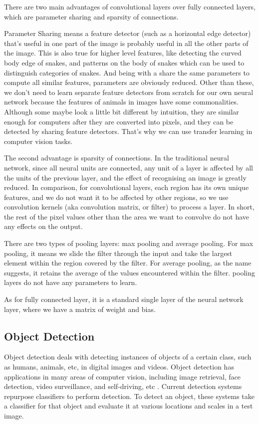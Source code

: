 \documentclass{article}
\begin{document}
There are two main advantages of convolutional layers over fully connected layers, which are parameter sharing and sparsity of connections.

Parameter Sharing means a feature detector (such as a horizontal edge detector) that's useful in one part of the image is probably useful in all the other parts of the image. This is also true for higher level features, like detecting the curved body edge of snakes, and patterns on the body of snakes which can be used to distinguish categories of snakes. And being with a share the same parameters to compute all similar features, parameters are obviously reduced. Other than these, we don't need to learn separate feature detectors from scratch for our own neural network because the features of animals in images have some commonalities. Although some maybe look a little bit different by intuition, they are similar enough for computers after they are converted into pixels, and they can be detected by sharing feature detectors. That's why we can use transfer learning in computer vision tasks.

The second advantage is sparsity of connections. In the traditional neural network, since all neural units are connected, any unit of a layer is affected by all the units of the previous layer, and the effect of recognising an image is greatly reduced. In comparison, for convolutional layers, each region has its own unique features, and we do not want it to be affected by other regions, so we use convolution kernels (aka convolution matrix, or filter) to process a layer. In short, the rest of the pixel values other than the area we want to convolve do not have any effects on the output.

There are two types of pooling layers: max pooling and average pooling. For max pooling, it means we slide the filter through the input and take the largest element within the region covered by the filter. 
For average pooling, as the name suggests, it retains the average of the values encountered within the filter. pooling layers do not have any parameters to learn.

As for fully connected layer, it is a standard single layer of the neural network layer, where we have a matrix of weight and bias.

\subsection{Object Detection}

Object detection deals with detecting instances of objects of a certain class, such as humans, animals, etc, in digital images and videos. Object detection has applications in many areas of computer vision, including image retrieval, face detection, video surveillance, and self-driving, etc \cite{vedaldi2009multiple}. Current detection systems repurpose classifiers to perform detection. To detect an object, these systems take a classifier for that object and evaluate it at various locations and scales in a test image.
\end{document}
